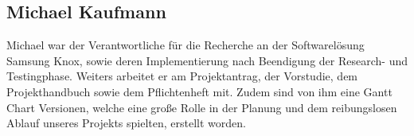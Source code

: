 \subsection{Michael Kaufmann}
Michael war der Verantwortliche für die Recherche an der Softwarelösung Samsung Knox, sowie deren Implementierung nach Beendigung der Research- und Testingphase. Weiters arbeitet er am Projektantrag, der Vorstudie, dem Projekthandbuch sowie dem Pflichtenheft mit. Zudem sind von ihm eine Gantt Chart Versionen, welche eine große Rolle in der Planung und dem reibungslosen Ablauf unseres Projekts spielten, erstellt worden.

\newpage

